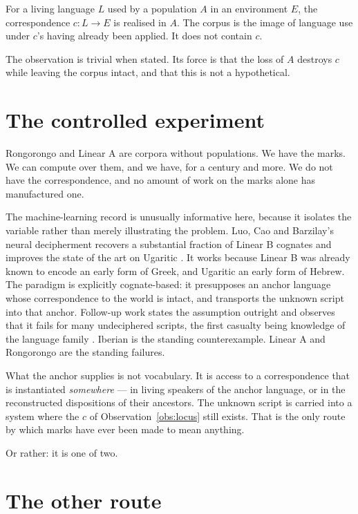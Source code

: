 \begin{observation}
\label{obs:locus}
For a living language $L$ used by a population $A$ in an
environment $E$, the correspondence $c : L \to E$ is realised in
$A$.
The corpus is the image of language use under $c$'s having already
been applied.
It does not contain $c$.
\end{observation}

\noindent
The observation is trivial when stated.
Its force is that the loss of $A$ destroys $c$ while leaving the
corpus intact, and that this is not a hypothetical.

\section{The controlled experiment}
\label{sec:decipherment}

Rongorongo and Linear A are corpora without populations.
We have the marks.
We can compute over them, and we have, for a century and more.
We do not have the correspondence, and no amount of work on the
marks alone has manufactured one.

The machine-learning record is unusually informative here, because
it isolates the variable rather than merely illustrating the
problem.
Luo, Cao and Barzilay's neural decipherment recovers a substantial
fraction of Linear B cognates and improves the state of the art on
Ugaritic \cite{luo2019}.
It works because Linear B was already known to encode an early form
of Greek, and Ugaritic an early form of Hebrew.
The paradigm is explicitly cognate-based: it presupposes an anchor
language whose correspondence to the world is intact, and
transports the unknown script into that anchor.
Follow-up work states the assumption outright and observes that it
fails for many undeciphered scripts, the first casualty being
knowledge of the language family \cite{luo2021}.
Iberian is the standing counterexample.
Linear A and Rongorongo are the standing failures.

What the anchor supplies is not vocabulary.
It is access to a correspondence that is instantiated
\emph{somewhere} --- in living speakers of the anchor language, or
in the reconstructed dispositions of their ancestors.
The unknown script is carried into a system where the $c$ of
Observation~\ref{obs:locus} still exists.
That is the only route by which marks have ever been made to mean
anything.

Or rather: it is one of two.

\section{The other route}
\label{sec:whales}

